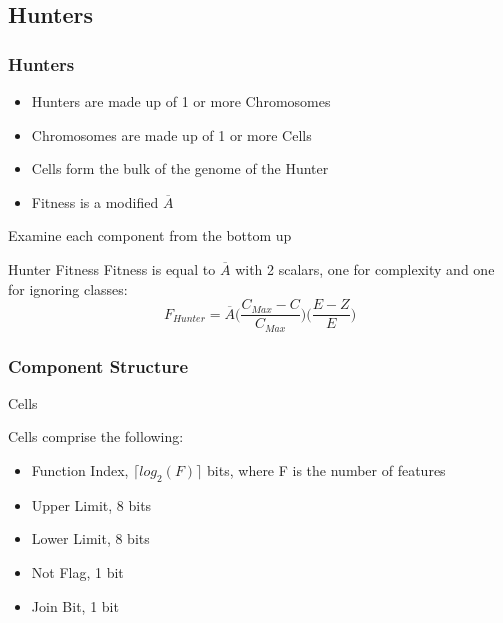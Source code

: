 \documentclass{beamer}
\begin{document}
\subsection{Hunters}
\begin{frame}
	\frametitle{Hunters}
		\begin{itemize}
			\item Hunters are made up of 1 or more Chromosomes
		\item Chromosomes are made up of 1 or more Cells
		\item Cells form the bulk of the genome of the Hunter
		\item Fitness is a modified $\overline{A}$
	\end{itemize}
Examine each component from the bottom up
\end{frame}

\begin{frame}{Hunter Fitness}
	Fitness is equal to $\overline{A}$ with 2 scalars, one for complexity and one for ignoring classes:
	$$F_{Hunter} = \overline{A} \bigg( \frac{C_{Max} - C}{C_{Max}}\bigg) \bigg( \frac{E-Z}{E}\bigg)$$
	  
\end{frame}

\subsubsection{Component Structure}
\begin{frame}{Cells}

Cells comprise the following:
\begin{itemize}
	\item Function Index, \(\lceil log_2(F)\rceil\) bits, where F is the number of features
	\item Upper Limit, 8 bits
	\item Lower Limit, 8 bits
	\item Not Flag, 1 bit
	\item Join Bit, 1 bit
\end{itemize}
\end{frame}
\end{document}
